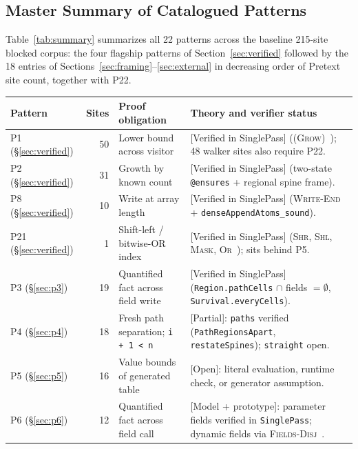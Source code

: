 \documentclass[10pt,a4paper]{article}
\newcommand{\code}[1]{\textcolor{codec}{\texttt{#1}}}
\newcommand{\lean}[1]{\texttt{\small #1}}
\newcommand{\ruleName}[1]{\textcolor{rulec}{\textsc{#1}}}
\newcommand{\status}[1]{\textcolor{leanc}{\textsf{\small[#1]}}}
\newcommand{\statusc}[1]{\textcolor{conjc}{\textsf{\small[#1]}}}
\newcommand{\statuso}[1]{\textcolor{accent}{\textsf{\small[#1]}}}
\renewcommand{\lean}[1]{\textcolor{leanc}{\texttt{\small #1}}}%
\begin{document}
\subsection{Master Summary of Catalogued Patterns}

Table~\ref{tab:summary} summarizes all 22 patterns across the baseline
215-site blocked corpus: the four flagship patterns of
Section~\ref{sec:verified} followed by the 18 entries of
Sections~\ref{sec:framing}--\ref{sec:external} in decreasing order of
Pretext site count, together with P22.

\begin{table}[!htbp]
\centering\footnotesize
\renewcommand{\arraystretch}{1.04}
\begin{tabularx}{\textwidth}{@{}l r >{\raggedright\arraybackslash}p{} >{\raggedright\arraybackslash}X@{}}
\toprule
Pattern & Sites & Proof obligation & Theory and verifier status\\
\midrule
P1 (\S\ref{sec:verified}) & 50 & Lower bound across visitor & \status{Verified in SinglePass} (\ruleName{(Grow)}~\cite{tf}); 48 walker sites also require P22.\\
P2 (\S\ref{sec:verified}) & 31 & Growth by known count & \status{Verified in SinglePass} (two-state \code{@ensures} + regional spine frame).\\
P8 (\S\ref{sec:verified}) & 10 & Write at array length & \status{Verified in SinglePass} (\ruleName{Write-End}~\cite{tf} + \lean{denseAppendAtoms\_sound}).\\
P21 (\S\ref{sec:verified}) & 1\rlap{\textsuperscript{\ddag}} & Shift-left / bitwise-OR index & \status{Verified in SinglePass} (\ruleName{Shr}, \ruleName{Shl}, \ruleName{Mask}, \ruleName{Or}~\cite{tf}); sits behind P5.\\
\midrule
P3 (\S\ref{sec:p3}) & 19 & Quantified fact across field write & \status{Verified in SinglePass} (\lean{Region.pathCells} $\cap$ fields $=\emptyset$, \lean{Survival.everyCells}).\\
P4 (\S\ref{sec:p4}) & 18 & Fresh path separation; \code{i + 1 < n} & \statuso{Partial}: \code{paths} verified (\lean{PathRegionsApart}, \lean{restateSpines}); \code{straight} open.\\
P5 (\S\ref{sec:p5}) & 16 & Value bounds of generated table & \statusc{Open}: literal evaluation, runtime check, or generator assumption.\\
P6 (\S\ref{sec:p6}) & 12 & Quantified fact across field call & \statuso{Model + prototype}: parameter fields verified in \lean{SinglePass}; dynamic fields via \ruleName{Fields-Disj}~\cite{el}.\\

\end{tabularx}
\end{table}
\end{document}
